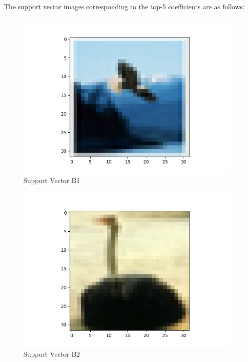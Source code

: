 \documentclass[11pt]{article}
\begin{document}
The support vector images corresponding to the top-5 coefficients are as follows:
\begin{figure}[H]
\begin{center}
  \includegraphics[scale=0.45]{b1.png}
  \caption{Support Vector B1}
  \label{fig3A}
\end{center}
\end{figure}
\begin{figure}[H]
\begin{center}
  \includegraphics[scale=0.45]{b2.png}
  \caption{Support Vector B2}
  \label{fig3B}
\end{center}
\end{figure}
\end{document}
